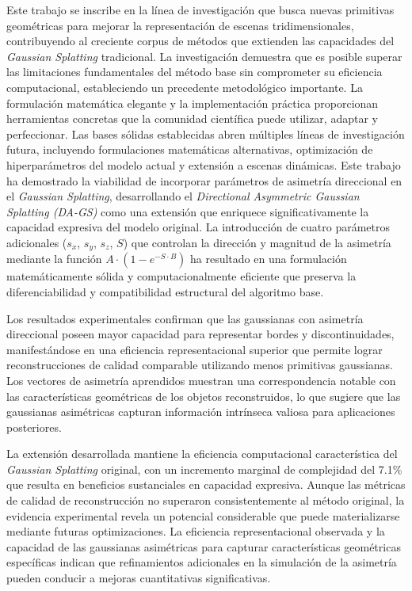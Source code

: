 \begin{conclusions}
Este trabajo se inscribe en la línea de investigación que busca nuevas primitivas geométricas para mejorar la representación de escenas tridimensionales, contribuyendo al creciente corpus de métodos que extienden las capacidades del \textit{Gaussian Splatting} tradicional. La investigación demuestra que es posible superar las limitaciones fundamentales del método base sin comprometer su eficiencia computacional, estableciendo un precedente metodológico importante. La formulación matemática elegante y la implementación práctica proporcionan herramientas concretas que la comunidad científica puede utilizar, adaptar y perfeccionar. Las bases sólidas establecidas abren múltiples líneas de investigación futura, incluyendo formulaciones matemáticas alternativas, optimización de hiperparámetros del modelo actual y extensión a escenas dinámicas.
Este trabajo ha demostrado la viabilidad de incorporar parámetros de asimetría direccional en el \textit{Gaussian Splatting}, desarrollando el \textit{Directional Asymmetric Gaussian Splatting (DA-GS)} como una extensión que enriquece significativamente la capacidad expresiva del modelo original. La introducción de cuatro parámetros adicionales ($s_x$, $s_y$, $s_z$, $S$) que controlan la dirección y magnitud de la asimetría mediante la función $A \cdot (1-e^{-S \cdot B})$ ha resultado en una formulación matemáticamente sólida y computacionalmente eficiente que preserva la diferenciabilidad y compatibilidad estructural del algoritmo base.

Los resultados experimentales confirman que las gaussianas con asimetría direccional poseen mayor capacidad para representar bordes y discontinuidades, manifestándose en una eficiencia representacional superior que permite lograr reconstrucciones de calidad comparable utilizando menos primitivas gaussianas. Los vectores de asimetría aprendidos muestran una correspondencia notable con las características geométricas de los objetos reconstruidos, lo que sugiere que las gaussianas asimétricas capturan información intrínseca valiosa para aplicaciones posteriores.

La extensión desarrollada mantiene la eficiencia computacional característica del \textit{Gaussian Splatting} original, con un incremento marginal de complejidad del 7.1\% que resulta en beneficios sustanciales en capacidad expresiva. Aunque las métricas de calidad de reconstrucción no superaron consistentemente al método original, la evidencia experimental revela un potencial considerable que puede materializarse mediante futuras optimizaciones. La eficiencia representacional observada y la capacidad de las gaussianas asimétricas para capturar características geométricas específicas indican que refinamientos adicionales en la simulación de la asimetría pueden conducir a mejoras cuantitativas significativas.


\end{conclusions}
